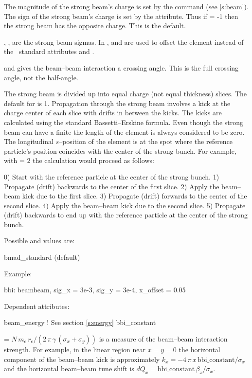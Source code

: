 The magnitude of the strong beam's charge is set by the 
command (see \ref{s:beam}).  The sign of the strong beam's charge is
set by the  attribute.  Thus if  = -1 then the
strong beam has the opposite charge. This is the default.

, ,  are the strong beam sigmas. 
In \bmad,  and  are used to offset the
 element instead of the \mad\ standard attributes
 and .

 and  gives the beam--beam interaction a
crossing angle. This is the full crossing angle, not the half-angle.

The strong beam is divided up into  equal charge (not
equal thickness) slices. The default for  is 1.
Propagation through the strong beam involves a kick at the charge
center of each slice with drifts in between the kicks. The kicks are
calculated using the standard Bassetti--Erskine formula.  Even though
the strong beam can have a finite  the length of the element
is always considered to be zero. The longitudinal $s$--position of the
 element is at the spot where the reference particle's
position coincides with the center of the strong bunch. For example,
with  = 2 the calculation would proceed as follows:
\begin{example}
  0) Start with the reference particle at the center of the strong bunch.
  1) Propagate (drift) backwards to the center of the first slice.
  2) Apply the beam--beam kick due to the first slice.
  3) Propagate (drift) forwards to the center of the second slice.
  4) Apply the beam--beam kick due to the second slice.
  5) Propagate (drift) backwards to end up with the reference particle
     at the center of the strong bunch.
\end{example}

\vskip0.2in \noindent
Possible  and  values are:
\vskip 0.01in
\begin{example}
   bmad\_standard  (default) 
\end{example}

\vskip0.2in \noindent
Example:
\begin{example}
  bbi: beambeam, sig\_x = 3e-3, sig\_y = 3e-4, x\_offset = 0.05
\end{example}

\vskip0.2in \noindent
Dependent attributes:
\begin{example}
  beam\_energy  ! See section \ref{s:energy}
  bbi\_constant 
\end{example}
 = $N \, m_e \, r_e / (2 \, \pi \, \gamma \, (\sigma_x + \sigma_y))$ 
is a measure of the beam--beam interaction strength. For example,
in the linear region near $x = y = 0$ the horizontal component of the
beam--beam kick is approximately 
$k_x = -4\, \pi \, x \, \mbox{bbi\_constant} / \sigma_x$ and the
horizontal beam--beam tune shift is 
$dQ_x = \mbox{bbi\_constant} \, \beta_x / \sigma_x$.


